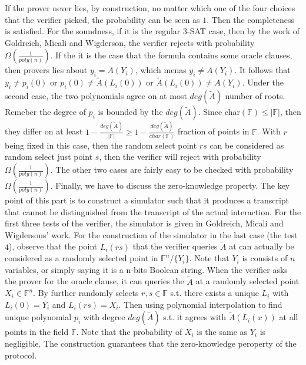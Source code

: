 \documentclass{article}
\begin{document}
If the prover never lies, by construction, no matter which one of the four choices that the verifier picked, the probability can be seen as $1$. Then the completeness is satisfied. For the soundness, if it is the regular 3-SAT case, then by the work of Goldreich, Micali and Wigderson, the verifier rejects with probability $\Omega(\frac{1}{poly(n)})$. If the it is the case that the formula contains some oracle clauses, then provers lies about $y_i = A(Y_i)$, which menas $y_i \neq A(Y_i)$. It follows that $y_i \neq p_i(0)$ or $p_i(0) \neq \tilde{A}(L_i(0))$ or $\tilde{A}(L_i(0)) \neq A(Y_i)$. Under the second case, the two polynomials agree on at most $deg(\tilde{A})$ number of roots. Remeber the degree of $p_i$ is bounded by the $deg(\tilde{A})$. Since char$(\mathbb{F}) \le |\mathbb{F}|$, then they differ on at least $1-\frac{deg(\tilde{A})}{|\mathbb{F}|} \ge 1-\frac{deg(\tilde{A})}{char(\mathbb{F})}$ fraction of points in $\mathbb{F}$. With $r$ being fixed in this case, then the random select point $rs$ can be considered as random select just point $s$, then the verifier will reject with probability $\Omega(\frac{1}{poly(n)})$. The other two cases are fairly easy to be checked with probability $\Omega(\frac{1}{poly(n)})$. Finally, we have to discuss the zero-knowledge property. The key point of this part is to construct a simulator such that it produces a transcript that cannot be distinguished from the transcript of the actual interaction. For the first three tests of the verifier, the simulator is given in Goldreich, Micali and Wigdersons' work. For the construction of the simulator in the last case (the test $4$), observe that the point $L_i(rs)$ that the verifier queries $\tilde{A}$ at can actually be considered as a randomly selected point in $\mathbb{F}^n/\{Y_i\}$. Note that $Y_i$ is consists of $n$ variables, or simply saying it is a n-bits Boolean string. When the verifier asks the prover for the oracle clause, it can queries the $\tilde{A}$ at a randomly selected point $X_i \in \mathbb{F}^n$. By further randomly selects $r,s\in \mathbb{F}$ s.t. there exists a unique $L_i$ with $L_i(0) = Y_i$ and $L_i(rs) = X_i$. Then using polynomial interpolation to find unique polynomial $p_i$ with degree $deg(\tilde{A})$ s.t. it agrees with $\tilde{A}(L_i(x))$ at all points in the field $\mathbb{F}$. Note that the probability of $X_i$ is the same as $Y_i$ is negligible. The construction guarantees that the zero-knowledge peroperty of the protocol. 



%
%


\end{document}
